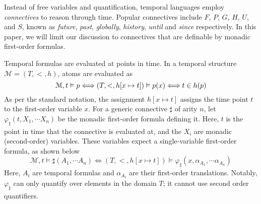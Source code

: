 \documentclass[a4paper,UKenglish,cleveref, autoref, thm-restate]{lipics-v2021}
\begin{document}
Instead of free variables and quantification, temporal languages employ \textit{connectives} to reason through time. Popular connectives include $F$, $P$, $G$, $H$, $U$, and $S$, known as \textit{future}, \textit{past}, \textit{globally}, \textit{history}, \textit{until} and \textit{since} respectively. In this paper, we will limit our discussion to connectives that are definable by monadic first-order formulas.

Temporal formulas are evaluated at points in time. In a temporal structure $\mathcal{M} = (T, <, h)$, atoms are evaluated as
\begin{equation*}
    \mathcal{M}, t \vDash p \Longleftrightarrow (T, <, h[x \mapsto t]) \vDash p(x) \Longleftrightarrow t \in h(p)\\
\end{equation*}
As per the standard notation, the assignment $h[x \mapsto t]$ assigns the time point $t$ to the first-order variable $x$. For a generic connective $\sharp$ of arity $n$, let $\varphi_\sharp(t, X_1, \cdots X_n)$ be the monadic first-order formula defining it. Here, $t$ is the point in time that the connective is evaluated at, and the $X_i$ are monadic (second-order) variables. These variables expect a single-variable first-order formula, as shown below
\begin{equation*}
    \mathcal{M}, t \vDash \sharp(A_1, \cdots A_n) \Longleftrightarrow (T, <, h[x \mapsto t]) \vDash \varphi_\sharp(x, \alpha_{A_1}, \cdots \alpha_{A_n})
\end{equation*}
Here, $A_i$ are temporal formulas and $\alpha_{A_i}$ are their first-order translations. Notably, $\varphi_\sharp$ can only quantify over elements in the domain $T$; it cannot use second order quantifiers.
\end{document}
